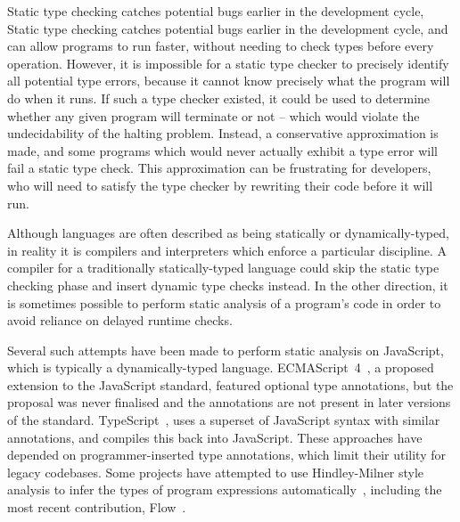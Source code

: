 \documentclass[12pt,a4paper,twoside,openright]{report}
\theoremstyle{definition}
\theoremstyle{dotless}
\begin{document}
Static type checking catches potential bugs earlier in the development cycle,
Static type checking catches potential bugs earlier in the development cycle,
and can allow programs to run faster, without needing to check types before
every operation. However, it is impossible for a static type checker to
precisely identify all potential type errors, because it cannot know precisely
what the program will do when it runs. If such a type checker existed, it could
be used to determine whether any given program will terminate or not -- which
would violate the undecidability of the halting problem. Instead, a
conservative approximation is made, and some programs which would never
actually exhibit a type error will fail a static type check. This approximation
can be frustrating for developers, who will need to satisfy the type checker by
rewriting their code before it will run.

Although languages are often described as being statically or
dynamically-typed, in reality it is compilers and interpreters which enforce a
particular discipline. A compiler for a traditionally statically-typed language
could skip the static type checking phase and insert dynamic type checks
instead. In the other direction, it is sometimes possible to perform static
analysis of a program's code in order to avoid reliance on delayed runtime
checks.

Several such attempts have been made to perform static analysis on JavaScript,
which is typically a dynamically-typed language. ECMAScript~4~\cite{es4},
a proposed extension to the JavaScript standard, featured optional type
annotations, but the proposal was never finalised and the annotations are not
present in later versions of the standard. TypeScript~\cite{ts}, uses a
superset of JavaScript syntax with similar annotations, and compiles this back
into JavaScript. These approaches have depended on programmer-inserted type
annotations, which limit their utility for legacy codebases. Some projects
have attempted to use Hindley-Milner style analysis to infer the types of
program expressions automatically~\cite{anderson06, tajs, guha}, including the most
recent contribution, Flow~\cite{flow}. 
\end{document}
